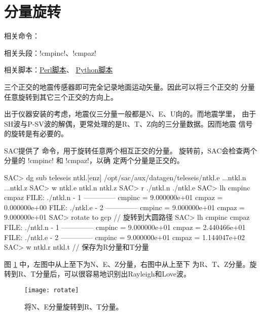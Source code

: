 \section{分量旋转}
\label{sec:traces-rotating}
相关命令：

相关头段：!cmpinc!、!cmpaz!

相关脚本：\hyperref[subsec:rotate-perl]{Perl脚本}、
          \hyperref[subsec:rotate-python]{Python脚本}

三个正交的地震传感器即可完全记录地面运动矢量。因此可以将三个正交的
分量任意旋转到其它三个正交的方向上。

出于仪器安装的考虑，地震仪三分量一般都是N、E、U向的。而地震学里，
由于SH波与P-SV波的解偶，更常处理的是R、T、Z向的三分量数据。因而地震
信号的旋转是有必要的。

SAC提供了  命令，用于旋转任意两个相互正交的分量。
旋转前，SAC会检查两个分量的 !cmpinc! 和 !cmpaz!，以确
定两个分量是正交的。

\begin{SACCode}
SAC> dg sub teleseis ntkl.[enz]
/opt/sac/aux/datagen/teleseis/ntkl.e ...ntkl.n ...ntkl.z
SAC> w ntkl.e ntkl.n ntkl.z
SAC> r ./ntkl.n ./ntkl.e
SAC> lh cmpinc cmpaz
  FILE: ./ntkl.n - 1
 --------------
     cmpinc = 9.000000e+01
      cmpaz = 0.000000e+00
  FILE: ./ntkl.e - 2
 --------------
     cmpinc = 9.000000e+01
      cmpaz = 9.000000e+01
SAC> rotate to gcp              // 旋转到大圆路径
SAC> lh cmpinc cmpaz
  FILE: ./ntkl.n - 1
 --------------
     cmpinc = 9.000000e+01
      cmpaz = 2.440466e+01
  FILE: ./ntkl.e - 2
 --------------
     cmpinc = 9.000000e+01
      cmpaz = 1.144047e+02
SAC> w ntkl.r ntkl.t            // 保存为R分量和T分量
\end{SACCode}

图 \ref{fig:rotate} 中，左图中从上至下为N、E、Z分量，右图中从上至下
为R、T、Z分量。旋转到R、T分量后，可以很容易地识别出Rayleigh和Love波。

\begin{figure}[H]
\centering
\texttt{[image: rotate]}
\caption[水平分量旋转]{将N、E分量旋转到R、T分量。}
\label{fig:rotate}
\end{figure}
